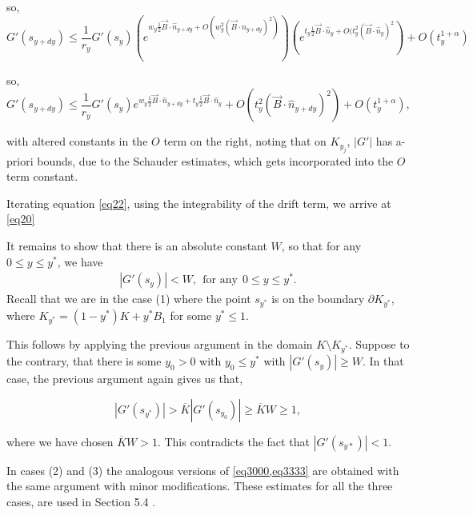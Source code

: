 \documentclass{article}
\theoremstyle{plain}
\theoremstyle{definition}
\theoremstyle{plain}
\begin{document}
so, \begin{equation}G'(s_{y+dy}) \le \frac{1}{r_y} G'(s_y) \left( e^{w_y \frac{1}{2} \vec{B} \cdot \hat{n}_{y+dy} + O\left(w_y^2 \left(\vec{B} \cdot \hat{n}_{y+dy}\right)^2\right)} \right) \left( e^{t_y \frac{1}{2} \vec{B} \cdot \hat{n}_y + O(t_y^2 \left(\vec{B} \cdot \hat{n}_y\right)^2}\right) + O(t_y^{1+\alpha}) \end{equation}

so, \begin{equation}\label{eq22}
G'(s_{y+dy}) \le \frac{1}{r_y} G'(s_y) e^{w_y \frac{1}{2} \vec{B} \cdot \hat{n}_{y+dy} + t_y \frac{1}{2} \vec{B} \cdot \hat{n}_y} + O\left(t_y^2 \left(\vec{B} \cdot \hat{n}_{y+dy}\right)^2\right) + O(t_y^{1+\alpha}),
\end{equation}

with altered constants in the $O$ term on the right, noting that on $K_{y_j}$,
$|G'|$ has a-priori bounds, due to the Schauder
estimates, which gets incorporated into the $O$ term constant.

Iterating equation \cref{eq22}, using the integrability of the drift
term, we arrive at \cref{eq20}


It remains to show that there is an absolute constant $W$, so 
that for any $0 \le y \le y^*$, we have
\begin{align}\label{eq3333}
|G'(s_y)| < W,  \ \ \text{for any}\ \ 0 \le y \le y^*.
\end{align}
Recall 
that we are in the case (1) where the point $s_{y^*}$ is on the boundary 
$\partial K_{y^*}$, where $K_{y^*} = (1-y^*) K + y^* B_1$ for some $y^* \le 1$.

This follows by applying the previous argument in the 
domain $K \setminus K_{y^*}$. Suppose to the contrary, that there 
is some $y_0 >0$ with $ y_0 \le y^*$ with $|G'(s_y)| \ge W$. In that case, the previous argument again gives us that,

\begin{equation} \label{eq333}
|G'(s_{y^*})| > \overline{K} |G'(s_{y_0})| \ge \overline{K} W\ge 1,
\end{equation}

where we have chosen 
$\overline{K}W > 1$. This contradicts the fact that $|G'(s_{y*})|<1$.

In cases (2) and (3) the analogous versions of \cref{eq3000,eq3333} are obtained with the same argument with minor modifications. These estimates for all the three cases, are used in Section 5.4 .
\end{document}
